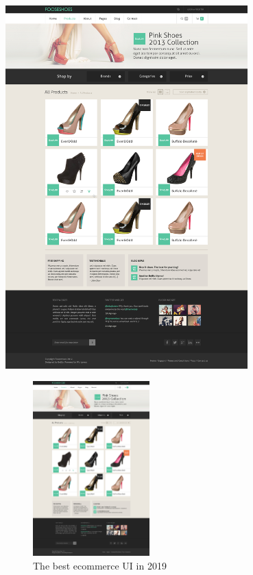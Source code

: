 \documentclass{article}
\begin{document}
\begin{center}
\includegraphics[width=0.7\textwidth]{demo.jpg}
\end{center}

\blindtext

\blindtext

\begin{figure}[h]
\centering 
\includegraphics[width=0.4\textwidth]{demo.jpg}
    \caption{The best ecommerce UI in 2019}
\end{figure}

\blindtext
\end{document}
